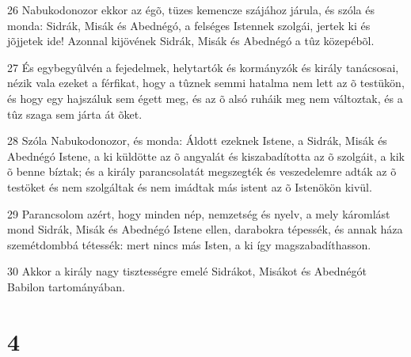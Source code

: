 \par 26 Nabukodonozor ekkor az égõ, tüzes kemencze szájához járula, és szóla és monda: Sidrák, Misák és Abednégó, a felséges Istennek szolgái, jertek ki és jõjjetek ide! Azonnal kijövének Sidrák, Misák és Abednégó a tûz közepébõl.
\par 27 És egybegyûlvén a fejedelmek, helytartók és kormányzók és király tanácsosai, nézik vala ezeket a férfikat, hogy a tûznek semmi hatalma nem lett az õ testükön, és hogy egy hajszáluk sem égett meg, és az õ alsó ruháik meg nem változtak, és a tûz szaga sem járta át õket.
\par 28 Szóla Nabukodonozor, és monda: Áldott ezeknek Istene, a Sidrák, Misák és Abednégó Istene, a ki küldötte az õ angyalát és kiszabadította az õ szolgáit, a kik õ benne bíztak; és a király parancsolatát megszegték és veszedelemre adták az õ testöket és nem szolgáltak és nem imádtak más istent az õ Istenökön kivül.
\par 29 Parancsolom azért, hogy minden nép, nemzetség és nyelv, a mely káromlást mond Sidrák, Misák és Abednégó Istene ellen, darabokra tépessék, és annak háza szemétdombbá tétessék: mert nincs más Isten, a ki így magszabadíthasson.
\par 30 Akkor a király nagy tisztességre emelé Sidrákot, Misákot és Abednégót Babilon tartományában.

\chapter{4}

